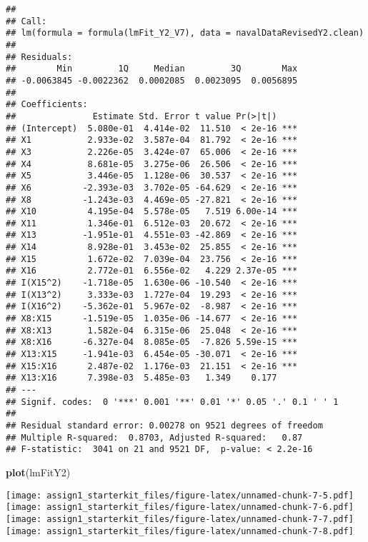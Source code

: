 \documentclass[
]{article}
\newenvironment{Shaded}{\begin{snugshade}}{\end{snugshade}}
\newcommand{\KeywordTok}[1]{\textcolor[rgb]{0.13,0.29,0.53}{\textbf{#1}}}
\newcommand{\NormalTok}[1]{#1}
\begin{document}
\begin{verbatim}
## 
## Call:
## lm(formula = formula(lmFit_Y2_V7), data = navalDataRevisedY2.clean)
## 
## Residuals:
##        Min         1Q     Median         3Q        Max 
## -0.0063845 -0.0022362  0.0002085  0.0023095  0.0056895 
## 
## Coefficients:
##               Estimate Std. Error t value Pr(>|t|)    
## (Intercept)  5.080e-01  4.414e-02  11.510  < 2e-16 ***
## X1           2.933e-02  3.587e-04  81.792  < 2e-16 ***
## X3           2.226e-05  3.424e-07  65.006  < 2e-16 ***
## X4           8.681e-05  3.275e-06  26.506  < 2e-16 ***
## X5           3.446e-05  1.128e-06  30.537  < 2e-16 ***
## X6          -2.393e-03  3.702e-05 -64.629  < 2e-16 ***
## X8          -1.243e-03  4.469e-05 -27.821  < 2e-16 ***
## X10          4.195e-04  5.578e-05   7.519 6.00e-14 ***
## X11          1.346e-01  6.512e-03  20.672  < 2e-16 ***
## X13         -1.951e-01  4.551e-03 -42.869  < 2e-16 ***
## X14          8.928e-01  3.453e-02  25.855  < 2e-16 ***
## X15          1.672e-02  7.039e-04  23.756  < 2e-16 ***
## X16          2.772e-01  6.556e-02   4.229 2.37e-05 ***
## I(X15^2)    -1.718e-05  1.630e-06 -10.540  < 2e-16 ***
## I(X13^2)     3.333e-03  1.727e-04  19.293  < 2e-16 ***
## I(X16^2)    -5.362e-01  5.967e-02  -8.987  < 2e-16 ***
## X8:X15      -1.519e-05  1.035e-06 -14.677  < 2e-16 ***
## X8:X13       1.582e-04  6.315e-06  25.048  < 2e-16 ***
## X8:X16      -6.327e-04  8.085e-05  -7.826 5.59e-15 ***
## X13:X15     -1.941e-03  6.454e-05 -30.071  < 2e-16 ***
## X15:X16      2.487e-02  1.176e-03  21.151  < 2e-16 ***
## X13:X16      7.398e-03  5.485e-03   1.349    0.177    
## ---
## Signif. codes:  0 '***' 0.001 '**' 0.01 '*' 0.05 '.' 0.1 ' ' 1
## 
## Residual standard error: 0.00278 on 9521 degrees of freedom
## Multiple R-squared:  0.8703, Adjusted R-squared:   0.87 
## F-statistic:  3041 on 21 and 9521 DF,  p-value: < 2.2e-16
\end{verbatim}

\begin{Shaded}
\begin{Highlighting}[]
\KeywordTok{plot}\NormalTok{(lmFitY2)}
\end{Highlighting}
\end{Shaded}

\texttt{[image: assign1\_starterkit\_files/figure-latex/unnamed-chunk-7-5.pdf]}
\texttt{[image: assign1\_starterkit\_files/figure-latex/unnamed-chunk-7-6.pdf]}
\texttt{[image: assign1\_starterkit\_files/figure-latex/unnamed-chunk-7-7.pdf]}
\texttt{[image: assign1\_starterkit\_files/figure-latex/unnamed-chunk-7-8.pdf]}
\end{document}
